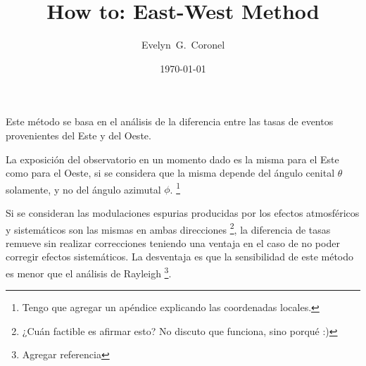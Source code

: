 
\usepackage{scalerel}
\usepackage{physics}



\title{How to: East-West Method}
\author{Evelyn~G.~Coronel}


\date[]{\lowercase{\today}} %


\maketitle

Este método se basa en el análisis de la diferencia entre las tasas de eventos provenientes del Este y del Oeste.

La exposición del observatorio en un momento dado es la misma para el Este como para el Oeste, si se considera que la misma depende del ángulo cenital $\theta$ solamente, y no del ángulo azimutal $\phi$. \footnote{Tengo que agregar un apéndice explicando las coordenadas locales.}

Si se consideran las modulaciones espurias producidas por los efectos atmosféricos y sistemáticos son las mismas en ambas direcciones \footnote{¿Cuán factible es afirmar esto? No discuto que funciona, sino porqué :)}, la diferencia de tasas remueve sin realizar correcciones teniendo una ventaja en el caso de no poder corregir efectos sistemáticos. La desventaja es que la sensibilidad de este método es menor  que el análisis de Rayleigh \footnote{Agregar referencia}.




